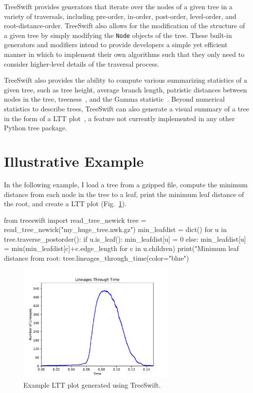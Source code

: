 TreeSwift provides generators that iterate over the nodes of a given tree in a variety of traversals, including pre-order, in-order, post-order, level-order, and root-distance-order. TreeSwift also allows for the modification of the structure of a given tree by simply modifying the \texttt{Node} objects of the tree. These built-in generators and modifiers intend to provide developers a simple yet efficient manner in which to implement their own algorithms such that they only need to consider higher-level details of the traversal process.

TreeSwift also provides the ability to compute various summarizing statistics of a given tree, such as tree height, average branch length, patristic distances between nodes in the tree, treeness~\cite{Phillips2003}, and the Gamma statistic~\cite{Pybus2000}. Beyond numerical statistics to describe trees, TreeSwift can also generate a visual summary of a tree in the form of a \gls{LTT} plot~\cite{Harvey1994}, a feature not currently implemented in any other Python tree package.

\section{Illustrative Example}\label{sec:treeswift-example}
In the following example, I load a tree from a gzipped file, compute the minimum distance from each node in the tree to a leaf, print the minimum leaf distance of the root, and create a \gls{LTT} plot (Fig.~\ref{fig:treeswift-ltt}).
\clearpage

\begin{python}
from treeswift import read_tree_newick
tree = read_tree_newick("my_huge_tree.nwk.gz")
min_leafdist = dict()
for u in tree.traverse_postorder():
    if u.is_leaf():
        min_leafdist[u] = 0
    else:
        min_leafdist[u] = min(min_leafdist[c]+c.edge_length for c in u.children)
print("Minimum leaf distance from root: %
tree.lineages_through_time(color="blue")
\end{python}

\begin{figure} %
\centering
\includegraphics[width=0.7\textwidth]{figs/treeswift-ltt}
\caption[Lineages Through Time]
{Example \gls{LTT} plot generated using TreeSwift.}
\label{fig:treeswift-ltt}
\end{figure}

